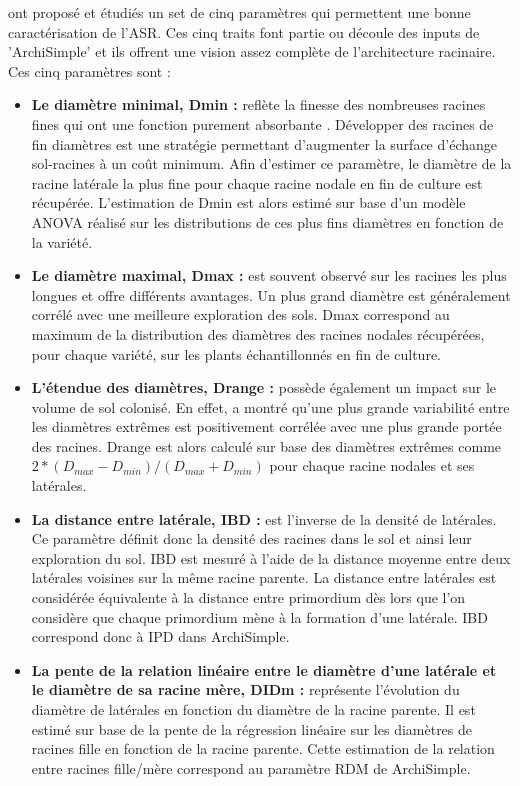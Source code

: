 \cite{pages_calibration_2014,wu_relationships_2016,pages_seeking_2018} ont proposé et étudiés un set de cinq paramètres qui permettent une bonne caractérisation de l'ASR.
Ces cinq traits font partie ou découle des inputs de 'ArchiSimple' et ils offrent une vision assez complète de l'architecture racinaire.
Ces cinq paramètres sont :
\begin{itemize}
    \item \textbf{Le diamètre minimal, Dmin : } reflète la finesse des nombreuses racines fines qui ont une fonction purement absorbante \citep{pages_seeking_2018}.
    Développer des racines de fin diamètres est une stratégie permettant d'augmenter la surface d'échange sol-racines à un coût minimum.
    Afin d'estimer ce paramètre, le diamètre de la racine latérale la plus fine pour chaque racine nodale en fin de culture est récupérée.
    L'estimation de Dmin est alors estimé sur base d'un modèle ANOVA réalisé sur les distributions de ces plus fins diamètres en fonction de la variété.
    \item \textbf{Le diamètre maximal, Dmax : } est souvent observé sur les racines les plus longues et offre différents avantages.
    Un plus grand diamètre est généralement corrélé avec une meilleure exploration des sols.
    Dmax correspond au maximum de la distribution des diamètres des racines nodales récupérées, pour chaque variété, sur les plants échantillonnés en fin de culture.
    \item \textbf{L'étendue des diamètres, Drange :} possède également un impact sur le volume de sol colonisé.
    En effet, \cite{pages_links_2011} a montré qu'une plus grande variabilité entre les diamètres extrêmes est positivement corrélée avec une plus grande portée des racines.
    Drange est alors calculé sur base des diamètres extrêmes comme $2*(D_{max}-D_{min})/(D_{max}+D_{min})$ pour chaque racine nodales et ses latérales.
    \item \textbf{La distance entre latérale, IBD : } est l'inverse de la densité de latérales.
    Ce paramètre définit donc la densité des racines dans le sol et ainsi leur exploration du sol.
    IBD est mesuré à l'aide de la distance moyenne entre deux latérales voisines sur la même racine parente.
    La distance entre latérales est considérée équivalente à la distance entre primordium dès lors que l'on considère que chaque primordium mène à la formation d'une latérale.
    IBD correspond donc à IPD dans ArchiSimple.
    \item \textbf{La pente de la relation linéaire entre le diamètre d'une latérale et le diamètre de sa racine mère, DIDm : } représente l'évolution du diamètre de latérales en fonction du diamètre de la racine parente.
    Il est estimé sur base de la pente de la régression linéaire sur les diamètres de racines fille en fonction de la racine parente.
    Cette estimation de la relation entre racines fille/mère correspond au paramètre RDM de ArchiSimple. 
\end{itemize}

